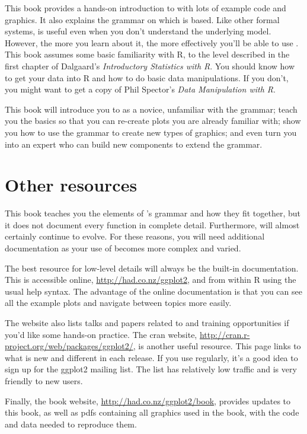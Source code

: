 This book provides a hands-on introduction to \ggplot with lots of example code and graphics. It also explains the grammar on which \ggplot is based. Like other formal systems, \ggplot is useful even when you don't understand the underlying model. However, the more you learn about it, the more effectively you'll be able to use \ggplot.  This book assumes some basic familiarity with R, to the level described in the first chapter of Dalgaard’s \emph{Introductory Statistics with R}. You should know how to get your data into R and how to do basic data manipulations.  If you don't, you might want to get a copy of Phil Spector's \emph{Data Manipulation with R}.  

This book will introduce you to \ggplot as a novice, unfamiliar with the grammar; teach you the basics so that you can re-create plots you are already familiar with; show you how to use the grammar to create new types of graphics; and even turn you into an expert who can build new components to extend the grammar.

\section{Other resources}
\label{sec:other_resources}

This book teaches you the elements of \ggplot's grammar and how they fit together, but it does not document every function in complete detail.  Furthermore, \ggplot will almost certainly continue to evolve.  For these reasons, you will need additional documentation as your use of \ggplot becomes more complex and varied.

The best resource for low-level details will always be the built-in documentation. This is accessible online, \url{http://had.co.nz/ggplot2}, and from within R using the usual help syntax. The advantage of the online documentation is that you can see all the example plots and navigate between topics more easily. 

The website also lists talks and papers related to \ggplot and training opportunities if you'd like some hands-on practice. The {\sc cran} website, \url{http://cran.r-project.org/web/packages/ggplot2/}, is another useful resource. This page links to what is new and different in each release.  If you use \ggplot regularly, it's a good idea to sign up for the ggplot2 mailing list.  The list has relatively low traffic and is very friendly to new users.

Finally, the book website, \url{http://had.co.nz/ggplot2/book}, provides updates to this book, as well as pdfs containing all graphics used in the book, with the code and data needed to reproduce them.  

